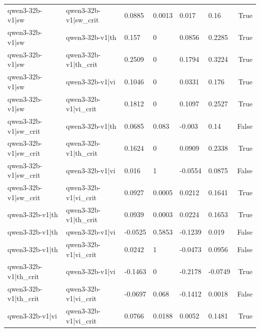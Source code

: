 \begin{table}
\begin{tabular}{llllllr}
qwen3-32b-v1|sw & qwen3-32b-v1|sw_crit & 0.0885 & 0.0013 & 0.017 & 0.16 & True \\
qwen3-32b-v1|sw & qwen3-32b-v1|th & 0.157 & 0 & 0.0856 & 0.2285 & True \\
qwen3-32b-v1|sw & qwen3-32b-v1|th_crit & 0.2509 & 0 & 0.1794 & 0.3224 & True \\
qwen3-32b-v1|sw & qwen3-32b-v1|vi & 0.1046 & 0 & 0.0331 & 0.176 & True \\
qwen3-32b-v1|sw & qwen3-32b-v1|vi_crit & 0.1812 & 0 & 0.1097 & 0.2527 & True \\
qwen3-32b-v1|sw_crit & qwen3-32b-v1|th & 0.0685 & 0.083 & -0.003 & 0.14 & False \\
qwen3-32b-v1|sw_crit & qwen3-32b-v1|th_crit & 0.1624 & 0 & 0.0909 & 0.2338 & True \\
qwen3-32b-v1|sw_crit & qwen3-32b-v1|vi & 0.016 & 1 & -0.0554 & 0.0875 & False \\
qwen3-32b-v1|sw_crit & qwen3-32b-v1|vi_crit & 0.0927 & 0.0005 & 0.0212 & 0.1641 & True \\
qwen3-32b-v1|th & qwen3-32b-v1|th_crit & 0.0939 & 0.0003 & 0.0224 & 0.1653 & True \\
qwen3-32b-v1|th & qwen3-32b-v1|vi & -0.0525 & 0.5853 & -0.1239 & 0.019 & False \\
qwen3-32b-v1|th & qwen3-32b-v1|vi_crit & 0.0242 & 1 & -0.0473 & 0.0956 & False \\
qwen3-32b-v1|th_crit & qwen3-32b-v1|vi & -0.1463 & 0 & -0.2178 & -0.0749 & True \\
qwen3-32b-v1|th_crit & qwen3-32b-v1|vi_crit & -0.0697 & 0.068 & -0.1412 & 0.0018 & False \\
qwen3-32b-v1|vi & qwen3-32b-v1|vi_crit & 0.0766 & 0.0188 & 0.0052 & 0.1481 & True \\
\bottomrule
\end{tabular}
\end{table}
